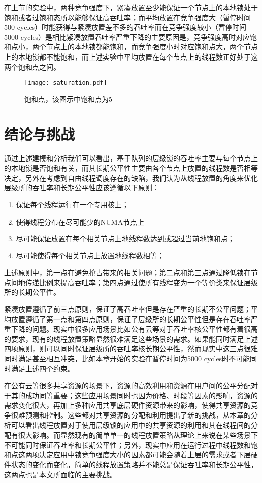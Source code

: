 在上节的实验中，两种竞争强度下，紧凑放置至少能保证一个节点上的本地锁处于饱和或者过饱和态所以能够保证高吞吐率；而平均放置在竞争强度大（暂停时间500 cycles）时能获得与紧凑放置差不多的吞吐率而在竞争强度较小（暂停时间5000 cycles）是相比紧凑放置吞吐率严重下降的主要原因是，竞争强度高时对应饱和点小，两个节点上的本地锁都能饱和，而竞争强度小时对应饱和点大，两个节点上的本地锁都不能饱和，而上述实验中平均放置在每个节点上的线程数正好处于这两个饱和点之间。

\begin{figure}[t]
	\centering
	\texttt{[image: saturation.pdf]}
	\caption{饱和点，该图示中饱和点为5}
	\label{Fig:saturation}
\end{figure}

\section{结论与挑战}
通过上述建模和分析我们可以看出，基于队列的层级锁的吞吐率主要与每个节点上的本地锁是否饱和有关，而其长期公平性主要由各个节点上放置的线程数是否相等决定，另外在考虑到自由线程调度存在的缺陷，我们认为从线程放置的角度来优化层级所的吞吐率和长期公平性应该遵循以下原则：
\begin{enumerate}
  \item 保证每个线程运行在一个专用核上；
  \item 使得线程分布在尽可能少的NUMA节点上
  \item 尽可能保证放置在每个相关节点上地线程数达到或超过当前地饱和点；
  \item 尽可能使得每个相关节点上放置地线程数相等；
\end{enumerate}
上述原则中，第一点在避免抢占带来的相关问题；第二点和第三点通过降低锁在节点间地传递比例来提高吞吐率；第四点通过使所有线程变为一个等价类来保证层级所的长期公平性。

紧凑放置遵循了前三点原则，保证了高吞吐率但是存在严重的长期不公平问题；平均放置遵循了第一点和第四点原则，保证了层级所的长期公平性但是存在吞吐率严重下降的问题。现实中很多应用场景比如公有云等对于吞吐率核公平性都有着很高的要求，现有的线程放置策略显然很难满足这些场景的需求。如果能同时满足上述四项原则，则可以同时保证层级所的吞吐率核长期公平性，然而现实中这三点很难同时满足甚至相互冲突，比如本章开始的实验在暂停时间为5000 cycles时不可能同时满足上述四个约束。

在公有云等很多共享资源的场景下，资源的高效利用和资源在用户间的公平分配对于其的成功同等重要；这些应用场景同时也因为价格、时段等因素的影响，资源的需求变化很大，再加上多种应用共享底层硬件资源带来的影响，使得共享资源的竞争很难预测和控制。这些都对共享资源的分配和利用提出了新的挑战，从本章的分析可以看出线程放置对于使用层级锁的应用中的共享资源的利用和其在线程间的分配有很大影响。而显然现有的简单单一的线程放置策略从理论上来说在某些场景下不可能同时保证吞吐率和长期公平性；另外，现实中应用在运行过程中线程数和饱和点这两项决定应用中锁竞争强度大小的因素都可能会随着上层的需求或者下层硬件状态的变化而变化，简单的线程放置策略并不能总是保证吞吐率和长期公平性，这两点也是本文所面临的主要挑战。

